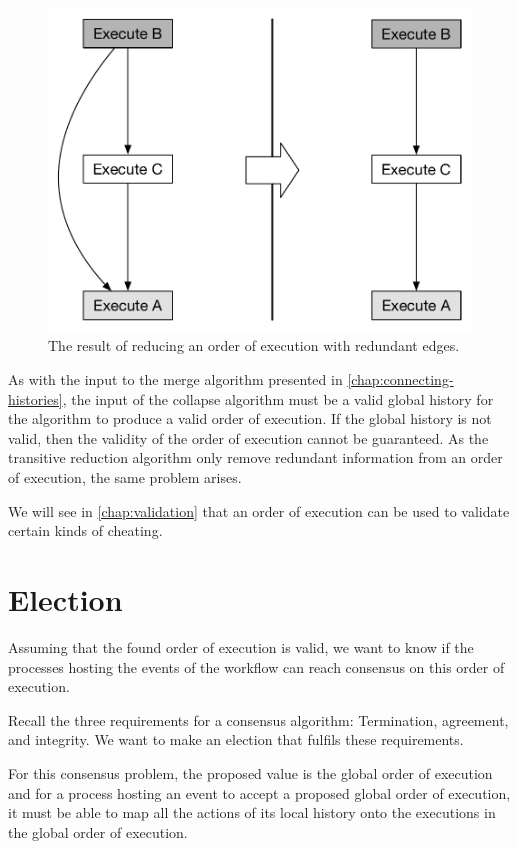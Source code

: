 	\begin{figure}[H]
		\centering
		\includegraphics[height=0.35\textheight]{5orderofexecution/images/reduce-before-after.pdf}
		\caption{The result of reducing an order of execution with redundant edges.}
		\label{fig:orderofexecution:reduce-before-after}
	\end{figure}

	\noindent As with the input to the merge algorithm presented in \autoref{chap:connecting-histories}, the input of the collapse algorithm must be a valid global history for the algorithm to produce a valid order of execution. If the global history is not valid, then the validity of the order of execution cannot be guaranteed. As the transitive reduction algorithm only remove redundant information from an order of execution, the same problem arises.
	
	We will see in \autoref{chap:validation} that an order of execution can be used to validate certain kinds of cheating.

	\section{Election}
	Assuming that the found order of execution is valid, we want to know if the processes hosting the events of the workflow can reach consensus on this order of execution.
	
	Recall the three requirements for a consensus algorithm: Termination, agreement, and integrity. We want to make an election that fulfils these requirements.
	
	\newpar For this consensus problem, the proposed value is the global order of execution and for a process hosting an event to accept a proposed global order of execution, it must be able to map all the actions of its local history onto the executions in the global order of execution.
	
